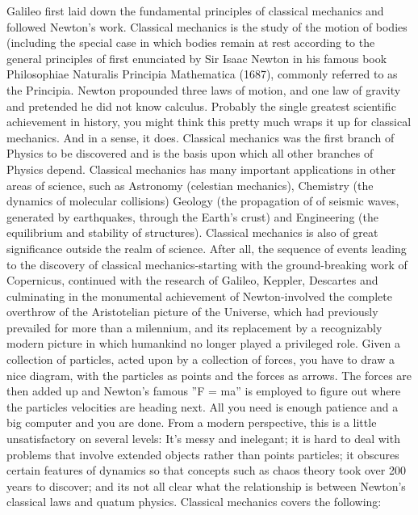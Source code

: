 \documentclass[a4paper,12pt]{article}
\begin{document}
Galileo first laid down the fundamental principles of classical mechanics and followed Newton’s work. Classical mechanics is the study of the motion of bodies (including the special case in which bodies remain at rest according to the general principles of first
enunciated by Sir Isaac Newton in his famous book Philosophiae Naturalis Principia Mathematica
(1687), commonly referred to as the Principia. Newton propounded three laws of motion, and one law
of gravity and pretended he did not know calculus. Probably the single greatest scientific achievement in history, you might think this pretty much wraps it up for classical mechanics. And in a
sense, it does.
Classical mechanics was the first branch of Physics to be discovered and is the basis upon
which all other branches of Physics depend. Classical mechanics has many important applications
in other areas of science, such as Astronomy (celestian mechanics), Chemistry (the dynamics of
molecular collisions) Geology (the propagation of of seismic waves, generated by earthquakes,
through the Earth’s crust) and Engineering (the equilibrium and stability of structures). Classical
mechanics is also of great significance outside the realm of science. After all, the sequence of
events leading to the discovery of classical mechanics-starting with the ground-breaking work of
Copernicus, continued with the research of Galileo, Keppler, Descartes and culminating in the
monumental achievement of Newton-involved the complete overthrow of the Aristotelian picture
of the Universe, which had previously prevailed for more than a milennium, and its replacement
by a recognizably modern picture in which humankind no longer played a privileged role.
Given a collection of particles, acted upon by a collection of forces, you have to draw a nice
diagram, with the particles as points and the forces as arrows. The forces are then added up and
Newton’s famous ”F = ma” is employed to figure out where the particles velocities are heading
next. All you need is enough patience and a big computer and you are done.
From a modern perspective, this is a little unsatisfactory on several levels: It’s messy and inelegant; it is hard to deal with problems that involve extended objects rather than points particles; it
obscures certain features of dynamics so that concepts such as chaos theory took over 200 years to
discover; and its not all clear what the relationship is between Newton’s classical laws and quatum
physics.
Classical mechanics covers the following: 
\end{document}
